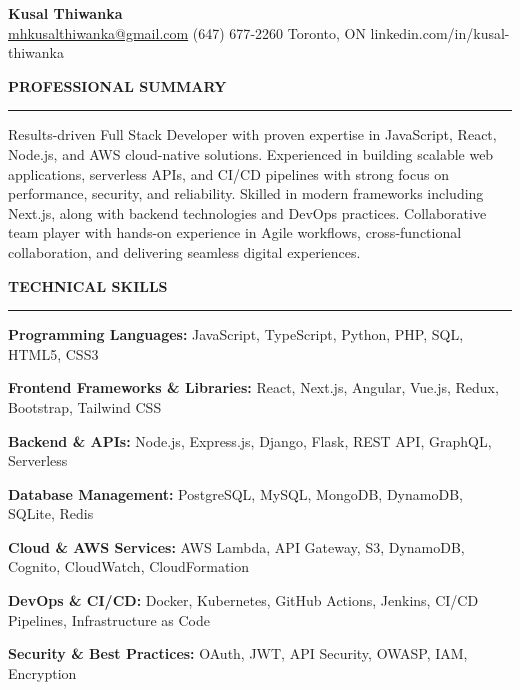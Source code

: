 \documentclass[10pt,letterpaper]{article}
\begin{document}
\begin{center}
{\LARGE\textbf{Kusal Thiwanka}}\\[3pt]
\href{mailto:mhkusalthiwanka@gmail.com}{mhkusalthiwanka@gmail.com}\hspace{2em}%
(647) 677{-}2260\hspace{2em}%
Toronto, ON\hspace{2em}
linkedin.com/in/kusal-thiwanka
\end{center}

\vspace{6pt}

\textbf{PROFESSIONAL SUMMARY}\\[-8pt]
\noindent\rule{\textwidth}{1pt}

\vspace{-2pt}

Results-driven Full Stack Developer with proven expertise in JavaScript, React, Node.js, and AWS cloud-native solutions. Experienced in building scalable web applications, serverless APIs, and CI/CD pipelines with strong focus on performance, security, and reliability. Skilled in modern frameworks including Next.js, along with backend technologies and DevOps practices. Collaborative team player with hands-on experience in Agile workflows, cross-functional collaboration, and delivering seamless digital experiences.

\vspace{8pt}

\textbf{TECHNICAL SKILLS}\\[-8pt]
\noindent\rule{\textwidth}{1pt}

\vspace{-2pt}

\textbf{Programming Languages:} JavaScript, TypeScript, Python, PHP, SQL, HTML5, CSS3

\textbf{Frontend Frameworks \& Libraries:} React, Next.js, Angular, Vue.js, Redux, Bootstrap, Tailwind CSS

\textbf{Backend \& APIs:} Node.js, Express.js, Django, Flask, REST API, GraphQL, Serverless

\textbf{Database Management:} PostgreSQL, MySQL, MongoDB, DynamoDB, SQLite, Redis

\textbf{Cloud \& AWS Services:} AWS Lambda, API Gateway, S3, DynamoDB, Cognito, CloudWatch, CloudFormation

\textbf{DevOps \& CI/CD:} Docker, Kubernetes, GitHub Actions, Jenkins, CI/CD Pipelines, Infrastructure as Code

\textbf{Security \& Best Practices:} OAuth, JWT, API Security, OWASP, IAM, Encryption
\end{document}
